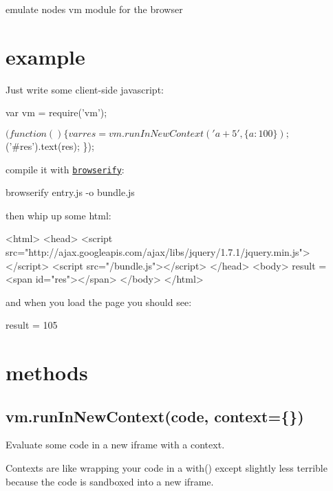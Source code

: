 emulate node\textquotesingle{}s vm module for the browser

\href{https://ci.testling.com/substack/vm-browserify}{\tt }

\section*{example}

Just write some client-\/side javascript\+:


\begin{DoxyCode}
var vm = require('vm');

$(function () \{
    var res = vm.runInNewContext('a + 5', \{ a : 100 \});
    $('#res').text(res);
\});
\end{DoxyCode}


compile it with \href{http://github.com/substack/node-browserify}{\tt browserify}\+:


\begin{DoxyCode}
browserify entry.js -o bundle.js
\end{DoxyCode}


then whip up some html\+:


\begin{DoxyCode}
<html>
  <head>
    <script src="http://ajax.googleapis.com/ajax/libs/jquery/1.7.1/jquery.min.js"></script>
    <script src="/bundle.js"></script>
  </head>
  <body>
    result = <span id="res"></span>
  </body>
</html>
\end{DoxyCode}


and when you load the page you should see\+:


\begin{DoxyCode}
result = 105
\end{DoxyCode}


\section*{methods}

\subsection*{vm.\+run\+In\+New\+Context(code, context=\{\})}

Evaluate some {\ttfamily code} in a new iframe with a {\ttfamily context}.

Contexts are like wrapping your code in a {\ttfamily with()} except slightly less terrible because the code is sandboxed into a new iframe.

